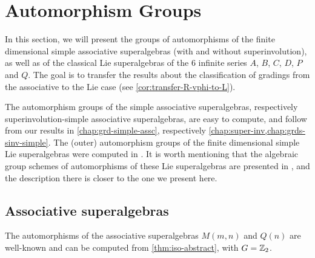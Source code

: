 \section{Automorphism Groups}\label{sec:Aut-Lie-chap}

In this section, we will present the groups of automorphisms of the finite dimensional simple associative superalgebras (with and without superinvolution), as well as of the classical Lie superalgebras of the $6$ infinite series $A$, $B$, $C$, $D$, $P$ and $Q$. 
The goal is to transfer the results about the classification of gradings from the associative to the Lie case (see \cref{cor:transfer-R-vphi-to-L}). 

The automorphism groups of the simple associative superalgebras, respectively superinvolution-simple associative superalgebras, are easy to compute, and follow from our results in \cref{chap:grd-simple-assc}, respectively \cref{chap:super-inv,chap:grds-sinv-simple}. 
The (outer) automorphism groups of the finite dimensional simple Lie superalgebras were computed in \cite{serganova}. 
It is worth mentioning that the algebraic group schemes of automorphisms of these Lie superalgebras are presented in \cite[Theorem 4.1]{Pianzola}, and the description there is closer to the one we present here. 

\subsection{Associative superalgebras}

The automorphisms of the associative superalgebras $M(m,n)$ and $Q(n)$ are well-known and can be computed from \cref{thm:iso-abstract}, with $G = \mathbb{Z}_2$. 

